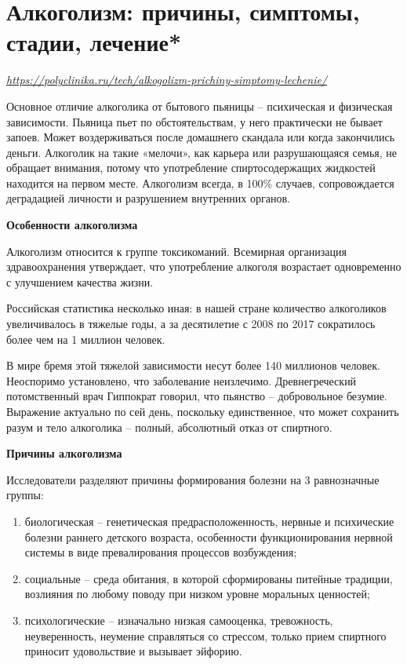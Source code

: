 \newpage
\section{Алкоголизм: причины, симптомы, стадии, лечение*}

 {\it \url{https://polyclinika.ru/tech/alkogolizm-prichiny-simptomy-lechenie/}}

Основное отличие алкоголика от бытового пьяницы – психическая и физическая зависимости. Пьяница пьет по обстоятельствам, у него практически не бывает запоев. Может воздерживаться после домашнего скандала или когда закончились деньги. Алкоголик на такие «мелочи», как карьера или разрушающаяся семья, не обращает внимания, потому что употребление спиртосодержащих жидкостей находится на первом месте. Алкоголизм всегда, в 100\% случаев, сопровождается деградацией личности и разрушением внутренних органов.

\textbf{Особенности алкоголизма}

Алкоголизм относится к группе токсикоманий. Всемирная организация здравоохранения утверждает, что употребление алкоголя возрастает одновременно с улучшением качества жизни.

Российская статистика несколько иная: в нашей стране количество алкоголиков увеличивалось в тяжелые годы, а за десятилетие с 2008 по 2017 сократилось более чем на 1 миллион человек.

В мире бремя этой тяжелой зависимости несут более 140 миллионов человек. Неоспоримо установлено, что заболевание неизлечимо. Древнегреческий потомственный врач Гиппократ говорил, что пьянство – добровольное безумие. Выражение актуально по сей день, поскольку единственное, что может сохранить разум и тело алкоголика – полный, абсолютный отказ от спиртного.

\textbf{Причины алкоголизма}

Исследователи разделяют причины формирования болезни на 3 равнозначные группы:
\begin{enumerate}
    \item биологическая – генетическая предрасположенность, нервные и психические болезни раннего детского возраста, особенности функционирования нервной системы в виде превалирования процессов возбуждения;
    \item социальные – среда обитания, в которой сформированы питейные традиции, возлияния по любому поводу при низком уровне моральных ценностей;
    \item психологические – изначально низкая самооценка, тревожность, неуверенность, неумение справляться со стрессом, только прием спиртного приносит удовольствие и вызывает эйфорию.
\end{enumerate}


